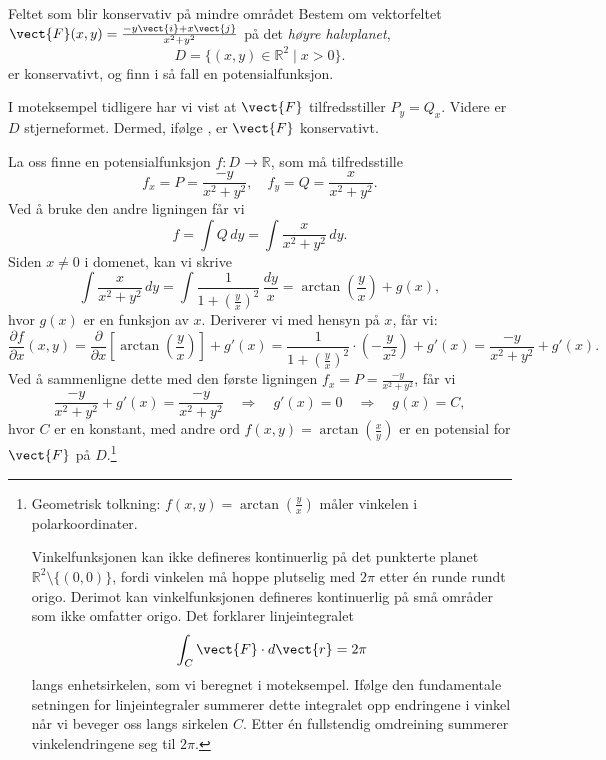 \begin{eks}{Feltet som blir konservativ på mindre området}
Bestem om vektorfeltet $\vect{F}(x,y) = \frac{-y\vect{i}+x\vect{j}}{x^2+y^2}$ på det \textit{høyre halvplanet},
\[
D = \{(x, y) \in \mathbb{R}^2 \mid x > 0\}.
\] er konservativt, og finn i så fall en potensialfunksjon.

I moteksempel tidligere har vi vist at $\vect{F}$ tilfredsstiller $P_y = Q_x$. Videre er $D$ stjerneformet. Dermed, ifølge , er $\vect{F}$ konservativt.

La oss finne en potensialfunksjon $f \colon D \to \mathbb{R}$, som må tilfredsstille
\[
f_x = P = \frac{-y}{x^2 + y^2}, \quad f_y = Q = \frac{x}{x^2 + y^2}.
\]
Ved å bruke den andre ligningen får vi
\[
f = \int Q\, dy = \int \frac{x}{x^2 + y^2}\, dy.
\]
Siden $x \ne 0$ i domenet, kan vi skrive
\[
\int \frac{x}{x^2 + y^2}\, dy = \int \frac{1}{1 + \left(\frac{y}{x}\right)^2} \, \frac{dy}{x} = \arctan\left(\frac{y}{x}\right) + g(x),
\]
hvor $g(x)$ er en funksjon av $x$. Deriverer vi med hensyn på $x$, får vi:
\[
\frac{\partial f}{\partial x}(x,y) = \frac{\partial}{\partial x} \left[\arctan\left(\frac{y}{x}\right)\right] + g'(x) 
= \frac{1}{1 + \left(\frac{y}{x}\right)^2} \cdot \left(-\frac{y}{x^2}\right) + g'(x) 
= \frac{-y}{x^2 + y^2} + g'(x).
\]
Ved å sammenligne dette med den første ligningen $f_x = P = \frac{-y}{x^2 + y^2}$, får vi
\[
\frac{-y}{x^2 + y^2} + g'(x) = \frac{-y}{x^2 + y^2} \quad \Rightarrow \quad g'(x) = 0 \quad \Rightarrow \quad g(x) = C,
\]
hvor $C$ er en konstant, med andre ord $f(x,y)=\arctan (\tfrac{x}{y})$ er en potensial for $\vect{F}$ på $D$.\footnote{Geometrisk tolkning: $f(x, y) = \arctan\left(\frac{y}{x}\right)$ måler vinkelen i polarkoordinater. 

Vinkelfunksjonen kan ikke defineres kontinuerlig på det punkterte planet $\mathbb{R}^2 \setminus \{(0, 0)\}$, fordi vinkelen må hoppe plutselig med $2\pi$ etter én runde rundt origo. Derimot kan vinkelfunksjonen defineres kontinuerlig på små områder som ikke omfatter origo. Det forklarer linjeintegralet 
\[
\int_C \vect{F} \cdot d\vect{r} = 2\pi
\]
langs enhetsirkelen, som vi beregnet i moteksempel. Ifølge den fundamentale setningen for linjeintegraler summerer dette integralet opp endringene i vinkel når vi beveger oss langs sirkelen $C$. Etter én fullstendig omdreining summerer vinkelendringene seg til $2\pi$.}
\end{eks}

